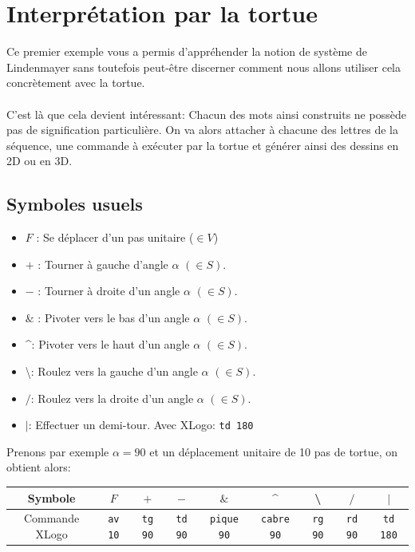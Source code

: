 \section{Interprétation par la tortue}
\noindent Ce premier exemple vous a permis d'appréhender la notion de système de Lindenmayer sans toutefois peut-être discerner comment nous allons utiliser cela concrètement avec la tortue.\\ \\
C'est là que cela devient intéressant: Chacun des mots ainsi construits ne possède pas de signification particulière. On va alors attacher à chacune des lettres de la séquence, une commande à exécuter par la tortue et générer ainsi des dessins en 2D ou en 3D.
\subsection{Symboles usuels}
\begin{itemize}
 \item [\textbullet] $F$ : Se déplacer d’un pas unitaire ($\in V$)
 \item [\textbullet] $+$ : Tourner à gauche d’angle $\alpha$ $(\in S)$.
 \item [\textbullet] $-$ : Tourner à droite d’un angle $\alpha$ $(\in S)$.
 \item [\textbullet] $\&$ : Pivoter vers le bas d’un angle $\alpha$ $(\in S)$.
 \item [\textbullet] \textasciicircum : Pivoter vers le haut d’un angle $\alpha$ $(\in S)$.
 \item [\textbullet] \textbackslash: Roulez vers la gauche d’un angle $\alpha$ $(\in S)$.
 \item [\textbullet] $/$: Roulez vers la droite d’un angle $\alpha$ $(\in S)$.
 \item [\textbullet] $|$: Effectuer un demi-tour. Avec XLogo: \texttt{td 180}
\end{itemize}
\vspace*{0.2cm}
Prenons par exemple $\alpha=90$ et un déplacement unitaire de 10 pas de tortue, on obtient alors:
\begin{center}
 \begin{tabular}{|c|c|c|c|c|c|c|c|c|}
 \hline
Symbole & $F$ & $+$ & $-$ & $\&$ & \textasciicircum & \textbackslash& $/$ & $|$ \\
 \hline
Commande XLogo & \texttt{av 10}&\texttt{tg 90}&\texttt{td 90}&\texttt{pique 90}&\texttt{cabre 90}&\texttt{rg 90}&\texttt{rd 90}&\texttt{td 180}\\
 \hline
\end{tabular}
\end{center}
